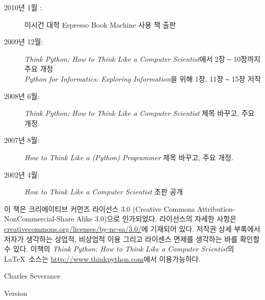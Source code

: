 \begin{latexonly}
{\begin{description}
\item[2010년 1월 :] 미시건 대학 Espresso Book Machine 사용 책 출판

\item[2009년 12월:] \emph{Think Python: How to Think Like a Computer Scientist}에서 2장 {\verb"~"} 10장까지 주요 개정 \\
\emph{Python for Informatics: Exploring Information}을 위해 1장, 11장 {\verb"~"} 15장 저작

\item[2008년 6월:] \emph{Think Python: How to Think Like a Computer Scientist} 제목 바꾸고, 주요 개정.

\item[2007년 8월:] \emph{How to Think Like a (Python) Programmer} 제목 바꾸고, 주요 개정.

\item[2002년 4월:] \emph{How to Think Like a Computer Scientist} 초판 공개

\end{description}

\vspace{0.2in}

이 책은 크리에이티브 커먼즈 라이선스 3.0 (Creative Commons Attribution-NonCommercial-Share Alike 3.0)으로 인가되었다.
라이선스의 자세한 사항은 \url{creativecommons.org/licenses/by-nc-sa/3.0/}에 기재되어 있다.
저작권 상세 부록에서 저자가 생각하는 상업적, 비상업적 이용 그리고 라이센스 면제를 생각하는 바를 확인할 수 있다.
이책의 \emph{Think Python: How to Think Like a Computer Scientist}의 \LaTeX\ 소스는 
\url{http://www.thinkpython.com}에서 이용가능하다.

\vspace{0.2in}

} %

\end{latexonly}



\begin{htmlonly}


{\Large \thetitle}

{\large 
Charles Severance}

Version \theversion

\setcounter{chapter}{-1}

\end{htmlonly}
